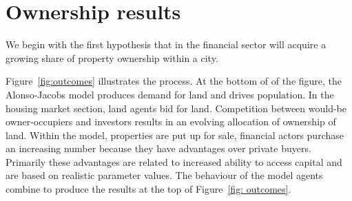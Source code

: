 \section{Ownership results}
We begin with the first hypothesis that in %
the financial sector will acquire a growing share of property ownership within a city. 





Figure~\ref{fig:outcomes} illustrates the process. At the bottom of of the figure, the \gls{Alonso-Jacobs model} produces demand for land and drives population. In the housing market section, land agents bid for land. Competition between would-be owner-occupiers and investors results in an evolving allocation of ownership of land. Within the model, properties are put up for sale, financial actors purchase an increasing number because they have advantages over private buyers. Primarily these advantages are related to increased ability to access capital and are based on realistic parameter values. The behaviour of the model agents combine to produce the results at the top of Figure~\ref{fig: outcomes}. 

